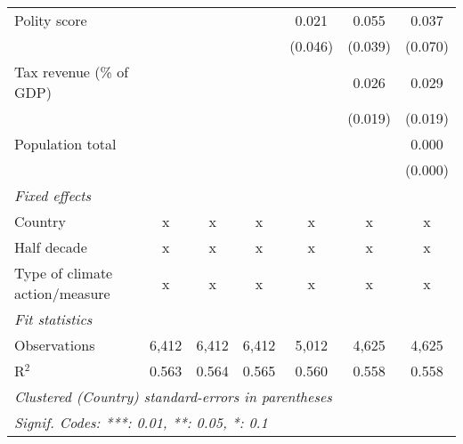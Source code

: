 \begin{tabular}{lcccccc}
   Polity score                                                &         &              &                & 0.021          & 0.055          & 0.037\\   
                                                               &         &              &                & (0.046)        & (0.039)        & (0.070)\\   
   Tax revenue (\% of GDP)                                     &         &              &                &                & 0.026          & 0.029\\   
                                                               &         &              &                &                & (0.019)        & (0.019)\\   
   Population total                                            &         &              &                &                &                & 0.000\\   
                                                               &         &              &                &                &                & (0.000)\\   
   \emph{Fixed effects}\\
   Country                                                     & x       & x            & x              & x              & x              & x\\  
   Half decade                                                 & x       & x            & x              & x              & x              & x\\  
   Type of climate action/measure                              & x       & x            & x              & x              & x              & x\\  
   \midrule \emph{Fit statistics}\\
   Observations                                                & 6,412   & 6,412        & 6,412          & 5,012          & 4,625          & 4,625\\  
   R$^2$                                                       & 0.563   & 0.564        & 0.565          & 0.560          & 0.558          & 0.558\\  
   \midrule
   \multicolumn{7}{l}{\emph{Clustered (Country) standard-errors in parentheses}}\\
   \multicolumn{7}{l}{\emph{Signif. Codes: ***: 0.01, **: 0.05, *: 0.1}}\\
\end{tabular}
\par\endgroup


